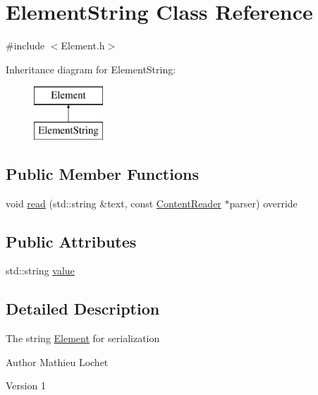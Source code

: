 \hypertarget{classElementString}{}\section{Element\+String Class Reference}
\label{classElementString}


{\ttfamily \#include $<$Element.\+h$>$}

Inheritance diagram for Element\+String\+:\begin{figure}[H]
\begin{center}
\leavevmode
\includegraphics[height=2.000000cm]{classElementString}
\end{center}
\end{figure}
\subsection*{Public Member Functions}
\begin{DoxyCompactItemize}
\item 
void \mbox{\hyperlink{classElementString_a781fe545117610d945772b240f24ac44}{read}} (std\+::string \&text, const \mbox{\hyperlink{classContentReader}{Content\+Reader}} $\ast$parser) override
\end{DoxyCompactItemize}
\subsection*{Public Attributes}
\begin{DoxyCompactItemize}
\item 
std\+::string \mbox{\hyperlink{classElementString_a755b6d208dcea9d496da60102e8f0f81}{value}}
\end{DoxyCompactItemize}


\subsection{Detailed Description}
The string \mbox{\hyperlink{classElement}{Element}} for serialization

\begin{DoxyAuthor}{Author}
Mathieu Lochet 
\end{DoxyAuthor}
\begin{DoxyVersion}{Version}
1 
\end{DoxyVersion}


